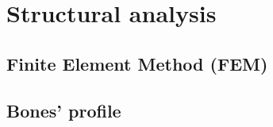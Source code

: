 \section{Structural analysis} %
\label{sec:structural_analysis}

\subsection{Finite Element Method (FEM)} %
\label{sub:finite_element_method}


\subsection{Bones' profile} %
\label{sub:bones_profile}

